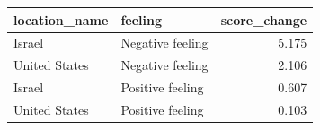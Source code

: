 \begin{tabular}{llr}
\toprule
location\_name & feeling & score\_change \\
\midrule
Israel & Negative feeling & 5.175 \\
United States & Negative feeling & 2.106 \\
Israel & Positive feeling & 0.607 \\
United States & Positive feeling & 0.103 \\
\bottomrule
\end{tabular}
